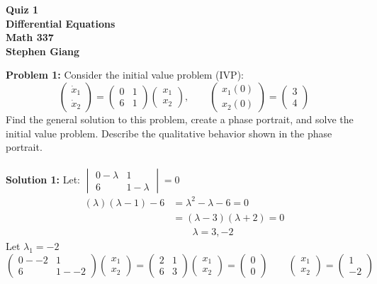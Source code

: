\documentclass[12pt]{article}
\begin{document}
	
	\begin{center}
		\textbf{Quiz 1} \\
		\textbf{Differential Equations} \\
		\textbf{Math 337} \\
		\textbf{Stephen Giang} \\
	\end{center}

\noindent \textbf{Problem 1: }Consider the initial value problem (IVP):
$$\begin{pmatrix}
	\dot{x}_1 \\
	\dot{x}_2
\end{pmatrix} = 
\begin{pmatrix}
	0 & 1 \\
	6 & 1
\end{pmatrix}
\begin{pmatrix}
	x_1 \\
	x_2
\end{pmatrix}, \qquad 
\begin{pmatrix}
	x_1(0) \\
	x_2(0)
\end{pmatrix} = 
\begin{pmatrix}
	3 \\ 
	4
\end{pmatrix}$$
Find the general solution to this problem, create a phase portrait, and solve the initial value
problem. Describe the qualitative behavior shown in the phase portrait. 
\\ \\
\noindent \textbf{Solution 1: } Let:
$		
\begin{vmatrix}
	0 - \lambda  & 1 \\
	6 & 1 - \lambda
\end{vmatrix} = 0
$
	\begin{align*}
		(\lambda)(\lambda - 1) - 6 &= \lambda^2 - \lambda - 6 = 0 \\
		&= (\lambda - 3)(\lambda + 2) = 0 \\
		& \qquad \lambda = 3, -2
	\end{align*}
Let $\lambda_1 = -2$
$$\begin{pmatrix}
	0 - -2  & 1 \\
	6 & 1 - -2
\end{pmatrix}
\begin{pmatrix}
	x_1 \\
	x_2
\end{pmatrix} = 
\begin{pmatrix}
	2 & 1 \\
	6 & 3
\end{pmatrix}
\begin{pmatrix}
	x_1 \\
	x_2
\end{pmatrix} = 
\begin{pmatrix}
	0 \\
	0
\end{pmatrix} \qquad 
\begin{pmatrix}
	x_1 \\
	x_2
\end{pmatrix} = 
\begin{pmatrix}
	1 \\
	-2
\end{pmatrix}$$
\end{document}
